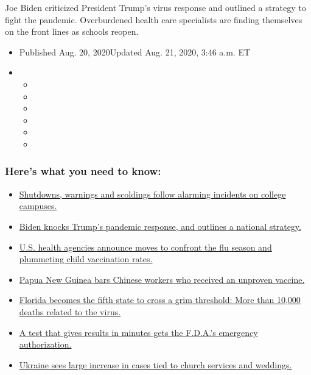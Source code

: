 Joe Biden criticized President Trump's virus response and outlined a
strategy to fight the pandemic. Overburdened health care specialists are
finding themselves on the front lines as schools reopen.

\begin{itemize}
\item
  Published Aug. 20, 2020Updated Aug. 21, 2020, 3:46 a.m. ET
\item
  \begin{itemize}
  \item
  \item
  \item
  \item
  \item
  \item
  \end{itemize}
\end{itemize}

\hypertarget{heres-what-you-need-to-know}{%
\subsubsection{Here's what you need to
know:}\label{heres-what-you-need-to-know}}

\begin{itemize}
\tightlist
\item
  \protect\hyperlink{link-68774d88}{Shutdowns, warnings and scoldings
  follow alarming incidents on college campuses.}
\item
  \protect\hyperlink{link-26b58724}{Biden knocks Trump's pandemic
  response, and outlines a national strategy.}
\item
  \protect\hyperlink{link-4e542da3}{U.S. health agencies announce moves
  to confront the flu season and plummeting child vaccination rates.}
\item
  \protect\hyperlink{link-7c7b347a}{Papua New Guinea bars Chinese
  workers who received an unproven vaccine.}
\item
  \protect\hyperlink{link-2944bade}{Florida becomes the fifth state to
  cross a grim threshold: More than 10,000 deaths related to the virus.}
\item
  \protect\hyperlink{link-31ce4f3f}{A test that gives results in minutes
  gets the F.D.A.'s emergency authorization.}
\item
  \protect\hyperlink{link-1ed3109b}{Ukraine sees large increase in cases
  tied to church services and weddings. }
\end{itemize}

